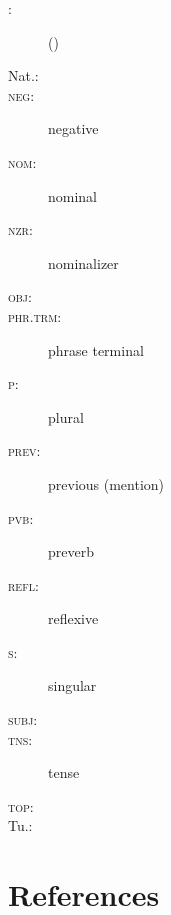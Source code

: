\documentclass[output=paper]{LSP/langsci}
\begin{document}
\begin{multicols}{2}
\begin{description}
\item[\rm {}:]  ()
\item[\rm Nat.:] 
\item[\rm \textsc{neg:}] negative
\item[\rm \textsc{nom:}] nominal
\item[\rm \textsc{nzr:}] nominalizer
\item[\rm \textsc{obj:}] 
\item[\rm \textsc{phr.trm:}] phrase terminal
\item[\rm \textsc{p:}] plural
\item[\rm \textsc{prev:}] previous (mention)
\item[\rm \textsc{pvb:}] preverb
\item[\rm \textsc{refl:}] reflexive
\item[\rm \textsc{s:}] singular
\item[\rm \textsc{subj:}] 
\item[\rm \textsc{tns:}] tense
\item[\rm \textsc{top:}] 
\item[\rm Tu.:] 
\end{description}
\end{multicols}
 

\printbibliography[heading=subbibliography,notkeyword=this]

\section*{References}

\newenvironment{reflist} {\begin{list} {} {\listparindent -.25in
\leftmargin .3in} \item \ \vspace{-.3in} } {\end{list} }
\end{document}
